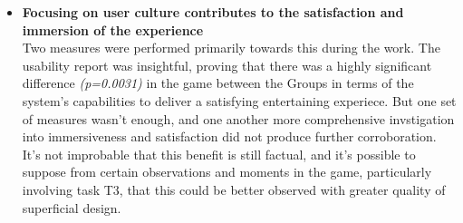 \begin{itemize}
        \item \textbf{Focusing on user culture contributes to the satisfaction and immersion of the experience}\\
            Two measures were performed primarily towards this during the work. The usability report was insightful, proving that there was a highly significant difference \emph{(p=0.0031)} in the game between the Groups in terms of the system's capabilities to deliver a satisfying entertaining experiece. But one set of measures wasn't enough, and one another more comprehensive invstigation into immersiveness and satisfaction did not produce further corroboration. It's not improbable that this benefit is still factual, and it's possible to suppose from certain observations and moments in the game, particularly involving task T3, that this could be better observed with greater quality of superficial design.
    \end{itemize}

